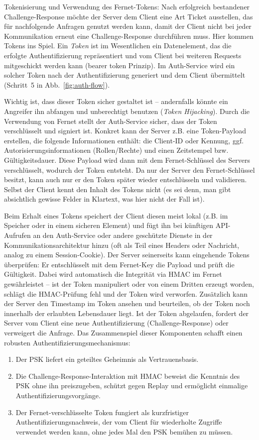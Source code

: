 Tokenisierung und Verwendung des Fernet-Tokens: Nach erfolgreich bestandener Challenge-Response möchte der Server dem Client eine Art \glqq Ticket\grqq{} ausstellen, das für nachfolgende Anfragen genutzt werden kann, damit der Client nicht bei jeder Kommunikation erneut eine Challenge-Response durchführen muss. Hier kommen Tokens ins Spiel. Ein \textit{Token} ist im Wesentlichen ein Datenelement, das die erfolgte Authentifizierung repräsentiert und vom Client bei weiteren Requests mitgeschickt werden kann (\glqq bearer token\grqq{} Prinzip). Im Auth-Service wird ein solcher Token nach der Authentifizierung generiert und dem Client übermittelt (Schritt 5 in Abb.~\ref{fig:auth-flow}).

Wichtig ist, dass dieser Token sicher gestaltet ist – andernfalls könnte ein Angreifer ihn abfangen und unberechtigt benutzen (\textit{Token Hijacking}). Durch die Verwendung von Fernet stellt der Auth-Service sicher, dass der Token verschlüsselt und signiert ist. Konkret kann der Server z.B. eine Token-Payload erstellen, die folgende Informationen enthält: die Client-ID oder Kennung, ggf. Autorisierungsinformationen (Rollen/Rechte) und einen Zeitstempel bzw. Gültigkeitsdauer. Diese Payload wird dann mit dem Fernet-Schlüssel des Servers verschlüsselt, wodurch der Token entsteht. Da nur der Server den Fernet-Schlüssel besitzt, kann auch nur er den Token später wieder entschlüsseln und validieren. Selbst der Client kennt den Inhalt des Tokens nicht (es sei denn, man gibt absichtlich gewisse Felder in Klartext, was hier nicht der Fall ist).

Beim Erhalt eines Tokens speichert der Client diesen meist lokal (z.B. im Speicher oder in einem sicheren Element) und fügt ihn bei künftigen API-Aufrufen an den Auth-Service oder andere geschützte Dienste in der Kommunikationsarchitektur hinzu (oft als Teil eines Headers oder Nachricht, analog zu einem Session-Cookie). Der Server seinerseits kann eingehende Tokens überprüfen: Er entschlüsselt mit dem Fernet-Key die Payload und prüft die Gültigkeit. Dabei wird automatisch die Integrität via HMAC im Fernet gewährleistet – ist der Token manipuliert oder von einem Dritten erzeugt worden, schlägt die HMAC-Prüfung fehl und der Token wird verworfen. Zusätzlich kann der Server den Timestamp im Token ansehen und beurteilen, ob der Token noch innerhalb der erlaubten Lebensdauer liegt. Ist der Token abgelaufen, fordert der Server vom Client eine neue Authentifizierung (Challenge-Response) oder verweigert die Anfrage.
Das Zusammenspiel dieser Komponenten schafft einen robusten Authentifizierungsmechanismus:
\begin{enumerate}
    \item Der PSK liefert ein geteiltes Geheimnis als Vertrauensbasis.
    \item Die Challenge-Response-Interaktion mit HMAC beweist die Kenntnis des PSK ohne ihn preiszugeben, schützt gegen Replay und ermöglicht einmalige Authentifizierungsvorgänge.
    \item Der Fernet-verschlüsselte Token fungiert als kurzfristiger Authentifizierungsnachweis, der vom Client für wiederholte Zugriffe verwendet werden kann, ohne jedes Mal den PSK bemühen zu müssen.
\end{enumerate}


